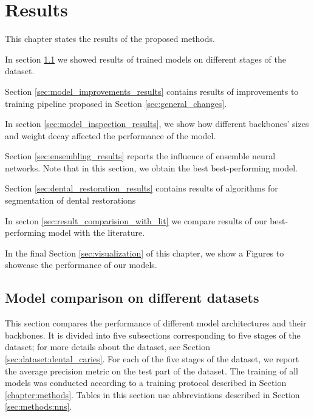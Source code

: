 \chapter{Results}
\label{chapter:results}
This chapter states the results of the proposed methods.

In section \ref{sec:model_comparison} we showed results of trained models on different stages of the dataset.

Section \ref{sec:model_improvements_results} contains results of improvements to training pipeline proposed in Section \ref{sec:general_changes}.

In section \ref{sec:model_inspection_results}, we show how different backbones' sizes and weight decay affected the performance of the model.

Section \ref{sec:ensembling_results} reports the influence of ensemble neural networks. Note that in this section, we obtain the best best-performing model.

Section \ref{sec:dental_restoration_results} contains results of algorithms for segmentation of dental restorations

In secton \ref{sec:result_comparision_with_lit} we compare results of our best-performing model with the literature.

In the final Section \ref{sec:visualization} of this chapter, we show a Figures to showcase the performance of our models.

\section{Model comparison on different datasets}
\label{sec:model_comparison}
This section compares the performance of different model architectures and their backbones. It is divided into five subsections corresponding to five stages of the dataset; for more details about the dataset, see Section \ref{sec:dataset:dental_caries}. For each of the five stages of the dataset, we report the average precision metric on the test part of the dataset. The training of all models was conducted according to a training protocol described in Section \ref{chapter:methods}. Tables in this section use abbreviations described in Section \ref{sec:methods:nns}.


